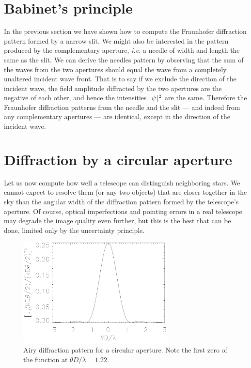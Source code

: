 \section{Babinet's principle}

In the previous section we have shown how to compute the Fraunhofer diffraction pattern formed
by a narrow slit. We might also be interested in the pattern produced by the complementary
aperture, {\it i.e.} a needle of width and length the same as the slit. We can derive the 
needles pattern by observing that the sum of the waves from the two apertures should equal the
wave from a completely unaltered incident wave front. That is to say if we exclude the
direction of the incident wave, the field amplitude diffracted by the two apertures are the
negative of each other, and hence the intensities $\mid\!\psi\!\mid^2$ are the same. 
Therefore the Fraunhofer diffraction patterns from the needle and the slit --- and indeed from
any complementary apertures --- are identical, except in the direction of the incident 
wave.

\section{Diffraction by a circular aperture}

Let us now compute how well a telescope can distinguish neighboring stars. We cannot expect to
resolve them (or any two objects) that are closer together in the sky than the angular width
of the diffraction pattern formed by the telescope's aperture. Of course, optical imperfections
and pointing errors in a real telescope may degrade the image quality even further, but this
is the best that can be done, limited only by the uncertainty principle.

\begin{figure}[th!]
	\centering
	\includegraphics[width=0.7\textwidth]{jinc2.eps}
  \caption{Airy diffraction pattern for a circular aperture. Note the first zero
of the function at $\theta D/\lambda=1.22$.}
  \label{fig:jinc2}
\end{figure}

